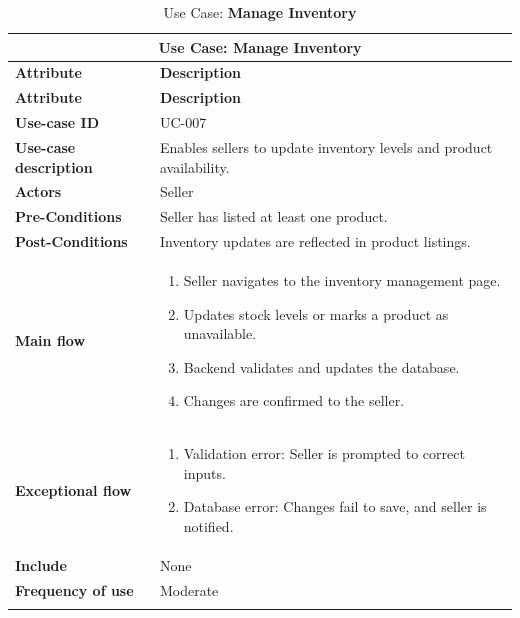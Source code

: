 \documentclass[12pt]{report}
\begin{document}
\begin{appendices}
	\begin{longtable}[H]{|l|p{9cm}||}
		\hline
		\multicolumn{2}{|c||}{\textbf{Use Case: Manage Inventory}}                                           \\
		\hline
		\textbf{Attribute}            & \textbf{Description}                                                 \\
		\hline
		\endfirsthead
		\hline
		\textbf{Attribute}            & \textbf{Description}                                                 \\
		\hline
		\endhead
		\textbf{Use-case ID}          & UC-007                                                               \\
		\hline
		\textbf{Use-case description} & Enables sellers to update inventory levels and product availability. \\
		\hline
		\textbf{Actors}               & Seller                                                               \\
		\hline
		\textbf{Pre-Conditions}       & Seller has listed at least one product.                              \\
		\hline
		\textbf{Post-Conditions}      & Inventory updates are reflected in product listings.                 \\
		\hline
		\textbf{Main flow}            & \begin{enumerate}
			                                \item Seller navigates to the inventory management page.
			                                \item Updates stock levels or marks a product as unavailable.
			                                \item Backend validates and updates the database.
			                                \item Changes are confirmed to the seller.
		                                \end{enumerate}         \\
		\hline
		\textbf{Exceptional flow}     & \begin{enumerate}
			                                \item Validation error: Seller is prompted to correct inputs.
			                                \item Database error: Changes fail to save, and seller is notified.
		                                \end{enumerate}   \\
		\hline
		\textbf{Include}              & None                                                                 \\
		\hline
		\textbf{Frequency of use}     & Moderate                                                             \\
		\hline
		\hline
		\caption{Use Case: \textbf{Manage Inventory}}\label{tab:tableManageInventory}
	\end{longtable}


\end{appendices}
\end{document}
